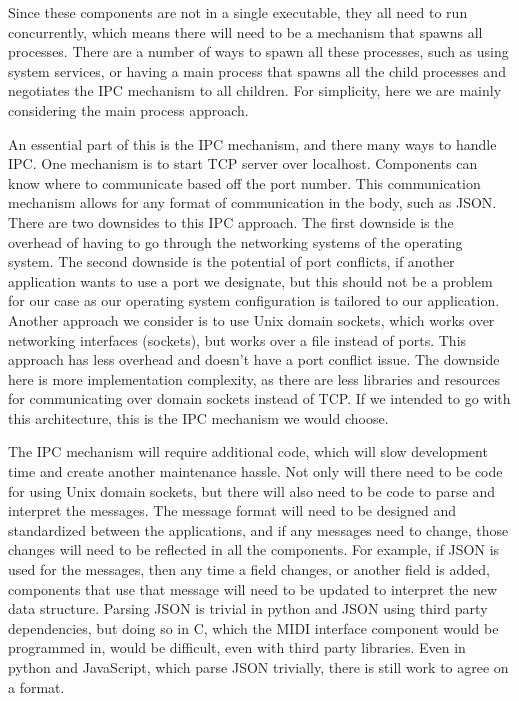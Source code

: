 Since these components are not in a single executable, they all need to run concurrently,
which means there will need to be a mechanism that spawns all processes. There are a
number of ways to spawn all these processes, such as using system services, or having a
main process that spawns all the child processes and negotiates the IPC mechanism to all
children. For simplicity, here we are mainly considering the main process approach.

An essential part of this is the IPC mechanism, and there many ways to handle IPC. One
mechanism is to start TCP server over localhost. Components can know where to communicate
based off the port number. This communication mechanism allows for any format of
communication in the body, such as JSON. There are two downsides to this IPC approach. The
first downside is the overhead of having to go through the networking systems of the
operating system. The second downside is the potential of port conflicts, if another
application wants to use a port we designate, but this should not be a problem for our
case as our operating system configuration is tailored to our application. Another
approach we consider is to use Unix domain sockets, which works over networking interfaces
(sockets), but works over a file instead of ports. This approach has less overhead and
doesn't have a port conflict issue. The downside here is more implementation complexity,
as there are less libraries and resources for communicating over domain sockets instead of
TCP. If we intended to go with this architecture, this is the IPC mechanism we would
choose.

The IPC mechanism will require additional code, which will slow development time and
create another maintenance hassle. Not only will there need to be code for using Unix
domain sockets, but there will also need to be code to parse and interpret the messages.
The message format will need to be designed and standardized between the applications, and
if any messages need to change, those changes will need to be reflected in all the
components. For example, if JSON is used for the messages, then any time a field changes,
or another field is added, components that use that message will need to be updated to
interpret the new data structure. Parsing JSON is trivial in python and JSON using third
party dependencies, but doing so in C, which the MIDI interface component would be
programmed in, would be difficult, even with third party libraries. Even in python and
JavaScript, which parse JSON trivially, there is still work to agree on a format.

